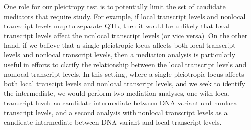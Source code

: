 \documentclass[oneside]{book}
\begin{document}
One role for our pleiotropy test is to potentially limit the set of candidate mediators that require study. For example, if local transcript levels and nonlocal transcript levels map to separate QTL, then it would be unlikely that local transcript levels affect the nonlocal transcript levels (or vice versa). On the other hand, if we believe that a single pleiotropic locus affects both local transcript levels and nonlocal transcript levels, then a mediation analysis is particularly useful in efforts to clarify the relationship between the local transcript levels and nonlocal transcript levels. In this setting, where a single pleiotropic locus affects both local transcipt levels and nonlocal transcript levels, and we seek to identify the intermediate, we would perform two mediation analyses, one with local transcript levels as candidate intermediate between DNA variant and nonlocal transcript levels, and a second analysis with nonlocal transcript levels as a candidate intermediate between DNA variant and local transcript levels.


\end{document}

